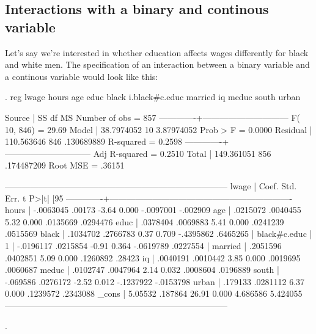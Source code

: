 \documentclass[12pt]{article}
\begin{document}
\subsection{Interactions with a binary and continous variable}
\label{sec:inter-with-binary}

Let's say we're interested in whether education affects wages
differently for black and white men. The specification of an
interaction between a binary variable and a continous variable would
look like this:


\begin{stlog}
     
. reg lwage hours age educ black i.black#c.educ married  iq meduc south urban

      Source |       SS       df       MS              Number of obs =     857
-------------+------------------------------           F( 10,   846) =   29.69
       Model |  38.7974052    10  3.87974052           Prob > F      =  0.0000
    Residual |  110.563646   846  .130689889           R-squared     =  0.2598
-------------+------------------------------           Adj R-squared =  0.2510
       Total |  149.361051   856  .174487209           Root MSE      =  .36151

------------------------------------------------------------------------------
       lwage |      Coef.   Std. Err.      t    P>|t|     [95%
-------------+----------------------------------------------------------------
       hours |  -.0063045     .00173    -3.64   0.000    -.0097001    -.002909
         age |   .0215072   .0040455     5.32   0.000     .0135669    .0294476
        educ |   .0378404   .0069883     5.41   0.000     .0241239    .0515569
       black |   .1034702   .2766783     0.37   0.709    -.4395862    .6465265
             |
black#c.educ |
          1  |  -.0196117   .0215854    -0.91   0.364    -.0619789    .0227554
             |
     married |   .2051596   .0402851     5.09   0.000     .1260892      .28423
          iq |   .0040191   .0010442     3.85   0.000     .0019695    .0060687
       meduc |   .0102747   .0047964     2.14   0.032     .0008604    .0196889
       south |   -.069586   .0276172    -2.52   0.012    -.1237922   -.0153798
       urban |    .179133   .0281112     6.37   0.000     .1239572    .2343088
       _cons |    5.05532    .187864    26.91   0.000     4.686586    5.424055
------------------------------------------------------------------------------

. 
\end{stlog}
\end{document}
